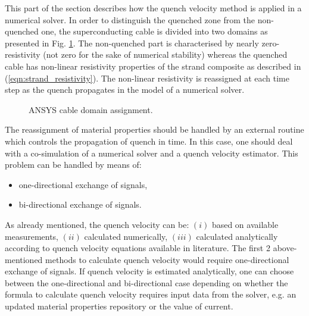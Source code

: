 
This part of the section describes how the quench velocity method is applied in a numerical solver. In order to distinguish the quenched zone from the non-quenched one, the superconducting cable is divided into two domains as presented in Fig. \ref{fig:ansys_material_assignment}. The non-quenched part is characterised by nearly zero-resistivity (not zero for the sake of numerical stability) whereas the quenched cable has non-linear resistivity properties of the strand composite as described in (\ref{eqn:strand_resistivity}). The non-linear resistivity is reassigned at each time step as the quench propagates in the model of a numerical solver.

\begin{figure}[H]
\centering
{}
\caption{ANSYS cable domain assignment.}
    \label{fig:ansys_material_assignment}
\end{figure}

The reassignment of material properties should be handled by an external routine which controls the propagation of quench in time. In this case, one should deal with a co-simulation of a numerical solver and a quench velocity estimator. This problem can be handled by means of: 

\begin{itemize}
    \item one-directional exchange of signals,
    \item bi-directional exchange of signals.
\end{itemize}

As already mentioned, the quench velocity can be: $(i)$ based on available measurements, $(ii)$ calculated numerically, $(iii)$ calculated analytically according to quench velocity equations available in literature. The first 2 above-mentioned methods to calculate quench velocity would require one-directional exchange of signals. If quench velocity is estimated analytically, one can choose between the one-directional and bi-directional case depending on whether the formula to calculate quench velocity requires input data from the solver, e.g. an updated material properties repository or the value of current.

